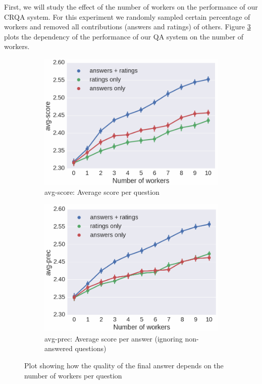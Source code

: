 \documentclass[letterpaper]{article}
\begin{document}
First, we will study the effect of the number of workers on the performance of our CRQA system.
For this experiment we randomly sampled certain percentage of workers and removed all contributions (answers and ratings) of others.
Figure \ref{fig:nworkers_vs_quality} plots the dependency of the performance of our QA system on the number of workers.

\begin{figure}[h!t]
  \begin{subfigure}[t]{0.5\textwidth}
	\centering
	\includegraphics[width=\textwidth]{img/nworkers_vs_accuracy}
	\caption{avg-score: Average score per question}
	\label{fig:nworkers_vs_accuracy}
  \end{subfigure}
  \begin{subfigure}[t]{0.5\textwidth}
	\centering
	\includegraphics[width=\textwidth]{img/nworkers_vs_precision}
	\caption{avg-prec: Average score per answer (ignoring non-answered questions)}
	\label{fig:nworkers_vs_precision}
  \end{subfigure}
	\caption{Plot showing how the quality of the final answer depends on the number of workers per question}
	\label{fig:nworkers_vs_quality}
\end{figure}
\end{document}
